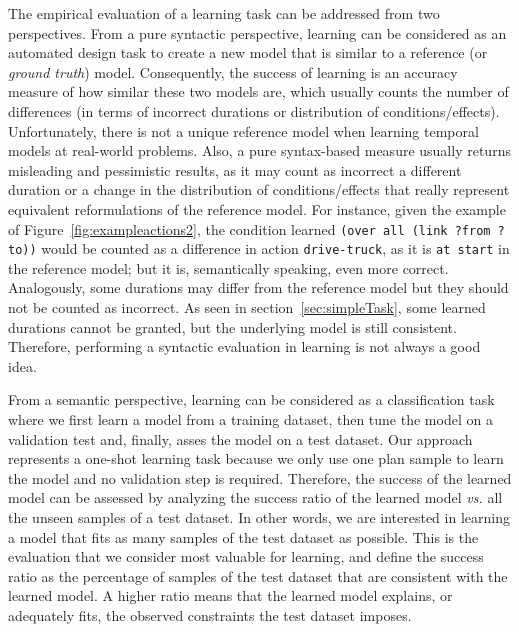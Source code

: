 \documentclass{ecai}
\begin{document}
The empirical evaluation of a learning task can be addressed from two perspectives. From a pure syntactic perspective, learning can be considered as an automated design task to create a new model that is similar to a reference (or {\em ground truth}) model. Consequently, the success of learning is an accuracy measure of how similar these two models are, which usually counts the number of differences (in terms of incorrect durations or distribution of conditions/effects). Unfortunately, there is not a unique reference model when learning temporal models at real-world problems. Also, a pure syntax-based measure usually returns misleading and pessimistic results, as it may count as incorrect a different duration or a change in the distribution of conditions/effects that really represent equivalent reformulations of the reference model. For instance, given the example of Figure~\ref{fig:exampleactions2}, the condition learned \texttt{(over all (link ?from ?to))} would be counted as a difference in action \texttt{drive-truck}, as it is \texttt{at start} in the reference model; but it is, semantically speaking, even more correct. Analogously, some durations may differ from the reference model but they should not be counted as incorrect. As seen in section~\ref{sec:simpleTask}, some learned durations cannot be granted, but the underlying model is still consistent. Therefore, performing a syntactic evaluation in learning is not always a good idea.

From a semantic perspective, learning can be considered as a classification task where we first learn a model from a training dataset, then tune the model on a validation test and, finally, asses the model on a test dataset. Our approach represents a one-shot learning task because we only use one plan sample to learn the model and no validation step is required.
Therefore, the success of the learned model can be assessed by analyzing the success ratio of the learned model \emph{vs.} all the unseen samples of a test dataset. In other words, we are interested in learning a model that fits as many samples of the test dataset as possible. This is the evaluation that we consider most valuable for learning, and define the success ratio as the percentage of samples of the test dataset that are consistent with the learned model. A higher ratio means that the learned model explains, or adequately fits, the observed constraints the test dataset imposes.
\end{document}
